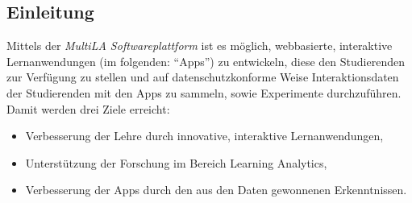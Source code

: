\documentclass[a0,portrait]{a0poster}
\begin{document}
\vspace{1cm} %


\begin{multicols}{2} %


%
%
%


\color{black}

\section*{Einleitung}

Mittels der \textit{MultiLA Softwareplattform} ist es möglich, webbasierte, interaktive Lernanwendungen (im folgenden: \enquote{Apps}) zu entwickeln, diese den Studierenden zur Verfügung zu stellen und auf datenschutzkonforme Weise Interaktionsdaten der Studierenden mit den Apps zu sammeln, sowie Experimente durchzuführen. Damit werden drei Ziele erreicht:

\begin{itemize}
    \item Verbesserung der Lehre durch innovative, interaktive Lernanwendungen,
    \item Unterstützung der Forschung im Bereich Learning Analytics,
    \item Verbesserung der Apps durch den aus den Daten gewonnenen Erkenntnissen.
\end{itemize}


\end{multicols}
\end{document}
